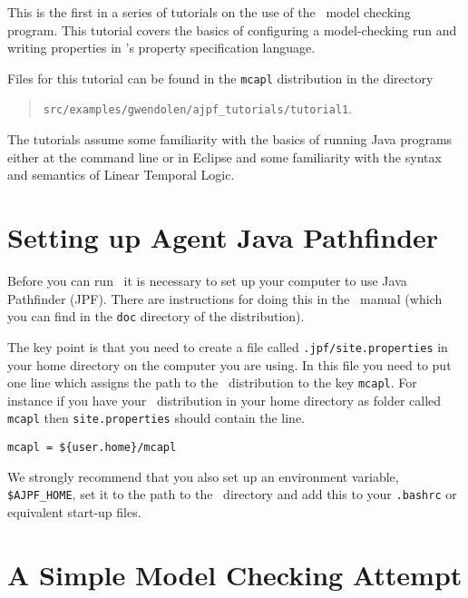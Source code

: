 
This is the first in a series of tutorials on the use of the \ajpf\ model checking program.  This tutorial covers the basics of configuring a model-checking run and writing properties in \ajpf's property specification language.

Files for this tutorial can be found in the \texttt{mcapl} distribution in the directory 
\begin{quote}
\texttt{src/examples/gwendolen/ajpf\_tutorials/tutorial1}.
\end{quote}

The tutorials assume some familiarity with the basics of running Java programs either at the command line or in Eclipse and some familiarity with the syntax and semantics of Linear Temporal Logic.

\section{Setting up Agent Java Pathfinder}
Before you can run \ajpf\ it is necessary to set up your computer to use Java Pathfinder (JPF).  There are instructions for doing this in the \mcapl\ manual (which you can find in the \texttt{doc} directory of the distribution).

The key point is that you need to create a file called \texttt{.jpf/site.properties} in your home directory on the computer you are using.  In this file you need to put one line which assigns the path to the \mcapl\ distribution to the key \texttt{mcapl}.  For instance if you have your \mcapl\ distribution in your home directory as  folder called \texttt{mcapl} then \texttt{site.properties} should contain the line.

\begin{verbatim}
mcapl = ${user.home}/mcapl
\end{verbatim}

\begin{sloppypar}
We strongly recommend that you also set up an environment variable, \texttt{\$AJPF\_HOME}, set it to the path to the \mcapl\ directory and add this to your \texttt{.bashrc} or equivalent start-up files.
\end{sloppypar}

\section{A Simple Model Checking Attempt}


